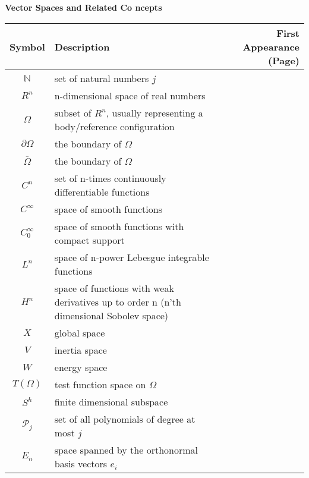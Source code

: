 \documentclass[main.tex]{subfiles}
\begin{document}
\noindent
\textbf{Vector Spaces and Related Co
ncepts}\\
\begin{tabularx}{\textwidth}{cXr}
\toprule
Symbol & Description & First Appearance (Page) \\ 
\midrule
\( \mathbb{N} \) & set of natural numbers \( j \) & \pageref{sym:natural} \\
\( R^n \) & n-dimensional space of real numbers & \pageref{sym:Rn} \\
\( \Omega \) & subset of \( R^n \), usually representing a body/reference configuration & \pageref{sym:Omega} \\
\( \partial \Omega \) & the boundary of $\Omega$ & \pageref{sym:boundaryOmega} \\
\( \bar{\Omega} \) & the boundary of $\Omega$ & \pageref{sym:baromega} \\
\( C^n \) & set of n-times continuously differentiable functions & \pageref{sym:Cn} \\
\( C^\infty \) & space of smooth functions & \pageref{sym:Cinfty} \\
\( C^\infty_0 \) & space of smooth functions with compact support & \pageref{sym:Cinftyzero} \\
\( L^n \) & space of n-power Lebesgue integrable functions & \pageref{sym:Ln} \\
\( H^n \) & space of functions with weak derivatives up to order n (n'th dimensional Sobolev space) & \pageref{sym:Hn} \\
\( X \) & global space & \pageref{sym:Xspace} \\
\( V \) & inertia space & \pageref{sym:Wspace} \\
\( W \) & energy space & \pageref{sym:Vspace} \\
\( T(\Omega) \) & test function space on \( \Omega \) & \pageref{sym:TOmega} \\
\( S^h \) & finite dimensional subspace & \pageref{sym:Sh1} \\
\( \mathcal{P}_j \) & set of all polynomials of degree at most \( j \) & \pageref{sym:poly} \\
\( E_n \) & space spanned by the orthonormal basis vectors $e_i$ & \pageref{sym:En} \\


\bottomrule
\end{tabularx}
\end{document}
